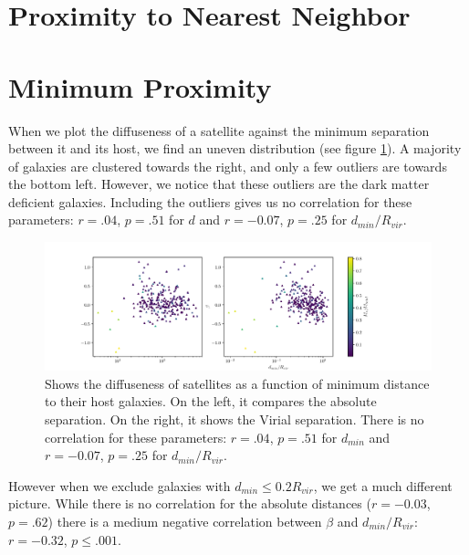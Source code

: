 \section{Proximity to Nearest Neighbor}


\section{Minimum Proximity}

When we plot the diffuseness of a satellite against the minimum separation between it and its host, we find an uneven distribution (see figure \ref{fig:beta-dmin}). A majority of galaxies are clustered towards the right, and only a few outliers are towards the bottom left. However, we notice that these outliers are the dark matter deficient galaxies. Including the outliers gives us no correlation for these parameters: $r = .04$, $p=.51$ for $d$ and $r = -0.07$, $p = .25$ for $d_{min} / R_{vir}$.
\begin{figure}
    \centering
    \includegraphics*[width=\textwidth*11/10]{figs/me/beta-dmin.pdf}
    \caption{Shows the diffuseness of satellites as a function of minimum distance to their host galaxies. On the left, it compares the absolute separation. On the right, it shows the Virial separation. There is no correlation for these parameters: $r = .04$, $p=.51$ for $d_{min}$ and $r = -0.07$, $p = .25$ for $d_{min} / R_{vir}$.}
    \label{fig:beta-dmin}
\end{figure}

However when we exclude galaxies with $d_{min} \leq 0.2 R_{vir}$, we get a much different picture. While there is no correlation for the absolute distances ($r = -0.03$, $p = .62$) there is a medium negative correlation between $\beta$ and $d_{min}/R_{vir}$: $r=-0.32$, $p \leq .001$.

